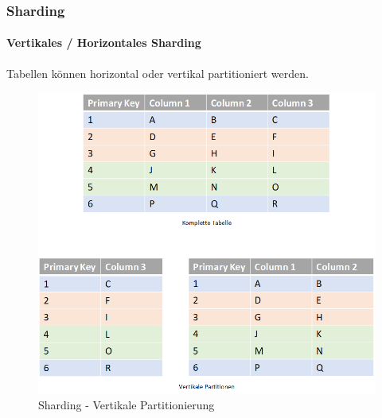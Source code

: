 
\begin{flushleft}
    \subsubsection{Sharding}
    \paragraph{Vertikales / Horizontales Sharding}
    Tabellen können horizontal oder vertikal partitioniert werden.
    \begin{figure}[H]
        \centering
        \includegraphics[width=0.8\linewidth]{source/implementation/evaluation/excursus_architecture/sharding_vertical_partitioning}
        \caption{Sharding - Vertikale Partitionierung}
        \label{fig:sharding_vertical_partitioning}
    \end{figure}
    \begin{figure}[H]
        \centering

\end{figure}
\end{flushleft}
